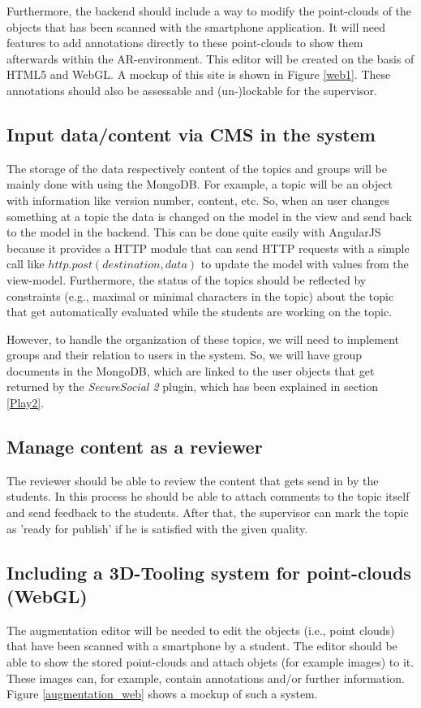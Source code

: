 Furthermore, the backend should include a way to modify the point-clouds of the objects that has been scanned with the smartphone application. It will need features to add annotations directly to these point-clouds to show them afterwards within the \ac{AR}-environment. This editor will be created on the basis of \ac{HTML5} and \ac{WebGL}. A mockup of this site is shown in Figure \ref{web1}. These annotations should also be assessable and (un-)lockable for the supervisor. 

\subsection{Input data/content via CMS in the system}
The storage of the data respectively content of the topics and groups will be mainly done with using the MongoDB. For example, a topic will be an object with information like version number, content, etc. So, when an user changes something at a topic the data is changed on the model in the view and send back to the model in the backend. This can be done quite easily with AngularJS because it provides a \ac{HTTP} module that can send \ac{HTTP} requests with a simple call like $http.post(destination,data)$ to update the model with values from the view-model. Furthermore, the status of the topics should be reflected by constraints (e.g., maximal or minimal characters in the topic) about the topic that get automatically evaluated while the students are working on the topic. 

However, to handle the organization of these topics, we will need to implement groups and their relation to users in the system. So, we will have group documents in the MongoDB, which are linked to the user objects that get returned by the \emph{SecureSocial 2} plugin, which has been explained in section \ref{Play2}.

\subsection{Manage content as a reviewer}
The reviewer should be able to review the content that gets send in by the students. In this process he should be able to attach comments to the topic itself and send feedback to the students.
After that, the supervisor can mark the topic as 'ready for publish' if he is satisfied with the given quality.


\subsection{Including a 3D-Tooling system for point-clouds (WebGL)}
The augmentation editor will be needed to edit the objects (i.e., point clouds) that have been scanned with a smartphone by a student.
The editor should be able to show the stored point-clouds and attach objets (for example images) to it. These images can, for example, contain annotations and/or further information. Figure \ref{augmentation_web} shows a mockup of such a system. 


